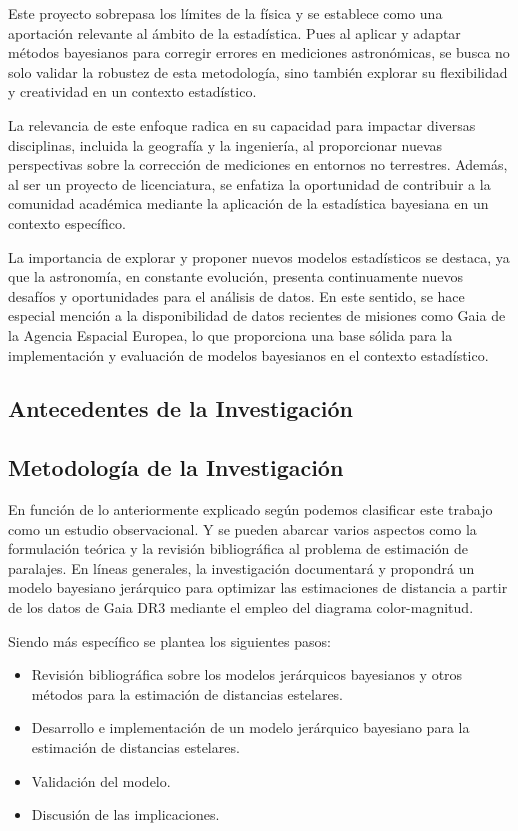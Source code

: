 \documentclass[stu, 12pt, letterpaper, donotrepeattitle, floatsintext, natbib]{apa7}
\begin{document}
Este proyecto sobrepasa los límites de la física y se establece como una
aportación relevante al ámbito de la estadística. Pues al aplicar y adaptar
métodos bayesianos para corregir errores en mediciones astronómicas,
se busca no solo validar la robustez de esta metodología, sino también
explorar su flexibilidad y creatividad en un contexto estadístico.

La relevancia de este enfoque radica en su capacidad para impactar diversas
disciplinas, incluida la geografía y la ingeniería, al proporcionar nuevas
perspectivas sobre la corrección de mediciones en entornos no terrestres.
Además, al ser un proyecto de licenciatura, se enfatiza la oportunidad de
contribuir a la comunidad académica mediante la aplicación de la estadística
bayesiana en un contexto específico.

La importancia de explorar y proponer nuevos modelos estadísticos se destaca,
ya que la astronomía, en constante evolución, presenta continuamente nuevos
desafíos y oportunidades para el análisis de datos. En este sentido, se hace
especial mención a la disponibilidad de datos recientes de misiones como Gaia
de la Agencia Espacial Europea, lo que proporciona una base sólida para la
implementación y evaluación de modelos bayesianos en el contexto estadístico.

\subsection{Antecedentes de la Investigación}

\subsection{Metodología de la Investigación}

En función de lo anteriormente explicado según  podemos
clasificar este trabajo como un estudio observacional. Y se pueden abarcar
varios aspectos como la formulación teórica y la revisión bibliográfica al
problema de estimación de paralajes. En líneas generales, la investigación
documentará y propondrá un modelo bayesiano jerárquico para optimizar las
estimaciones de distancia a partir de los datos de Gaia DR3 mediante el
empleo del diagrama color-magnitud.

Siendo más específico se plantea los siguientes pasos:

\begin{itemize}
    \item Revisión bibliográfica sobre los modelos jerárquicos bayesianos y otros métodos para la estimación de distancias estelares.
    \item Desarrollo e implementación de un modelo jerárquico bayesiano para la estimación de distancias estelares.
    \item Validación del modelo.
    \item Discusión de las implicaciones.
\end{itemize}
\end{document}
